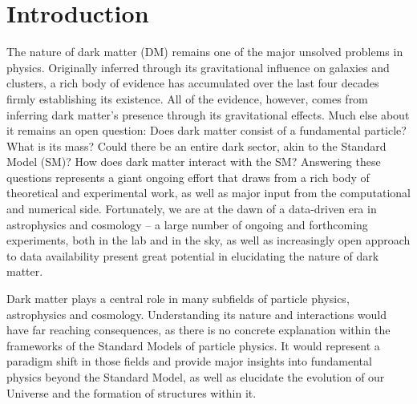 \chapter{Introduction}
\label{ch:intro}

The nature of dark matter (DM) remains one of the major unsolved problems in physics. Originally inferred through its gravitational influence on galaxies and clusters, a rich body of evidence has accumulated over the last four decades firmly establishing its existence. All of the evidence, however, comes from inferring dark matter's presence through its gravitational effects. Much else about it remains an open question: Does dark matter consist  of a fundamental particle? What is its mass? Could there be an entire dark sector, akin to the Standard Model (SM)? How does dark matter interact with the SM? Answering these questions represents a giant ongoing effort that draws from a rich body of theoretical and experimental work, as well as major input from the computational and numerical side. Fortunately, we are at the dawn of a data-driven era in astrophysics and cosmology -- a large number of ongoing and forthcoming experiments, both in the lab and in the sky, as well as increasingly open approach to data availability present great potential in elucidating the nature of dark matter. 

Dark matter plays a central role in many subfields of particle physics, astrophysics and cosmology. Understanding its nature and interactions would have far reaching consequences, as there is no concrete explanation within the frameworks of the Standard Models of particle physics. It would represent a paradigm shift in those fields and provide major insights into fundamental physics beyond the Standard Model, as well as elucidate the evolution of our Universe and the formation of structures within it. 


